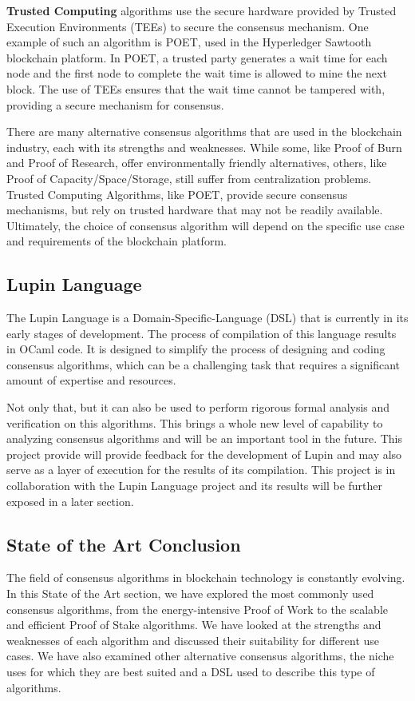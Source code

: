 \textbf{Trusted Computing} \cite{bowman2021elapsed} algorithms use the secure hardware provided by Trusted Execution Environments (TEEs) to secure the consensus mechanism. One example of such an algorithm is POET, used in the Hyperledger Sawtooth blockchain platform. In POET, a trusted party generates a wait time for each node and the first node to complete the wait time is allowed to mine the next block. The use of TEEs ensures that the wait time cannot be tampered with, providing a secure mechanism for consensus.

There are many alternative consensus algorithms that are used in the blockchain industry, each with its strengths and weaknesses.
While some, like Proof of Burn and Proof of Research, offer environmentally friendly alternatives, others, like Proof of Capacity/Space/Sto\-rage, still suffer from centralization problems. Trusted Computing Algorithms, like POET, provide secure consensus mechanisms, but rely on trusted hardware that may not be readily available. Ultimately, the choice of consensus algorithm will depend on the specific use case and requirements of the blockchain platform.

\subsection*{\textbf{Lupin Language}}
\label{lupin}

The Lupin Language is a Domain-Specific-Language (DSL) that is currently in its early stages of development. 
The process of compilation of this language results in OCaml code.
It is designed to simplify the process of designing and coding consensus algorithms, which can be a challenging task that requires a significant amount of expertise and resources.

Not only that, but it can also be used to perform rigorous formal analysis and verification on this algorithms. 
This brings a whole new level of capability to analyzing consensus algorithms and will be an important tool in the future.
This project provide will provide feedback for the development of Lupin and may also serve as a layer of execution for the results of its compilation. 
This project is in collaboration with the Lupin Language project and its results will be further exposed in a later section.


\subsection*{State of the Art Conclusion}
The field of consensus algorithms in blockchain technology is constantly evolving. In this State of the Art section, we have explored the most commonly used consensus algorithms, from the energy-intensive Proof of Work to the scalable and efficient Proof of Stake algorithms. We have looked at the strengths and weaknesses of each algorithm and discussed their suitability for different use cases. We have also examined other alternative consensus algorithms, the niche uses for which they are best suited and a DSL used to describe this type of algorithms.

